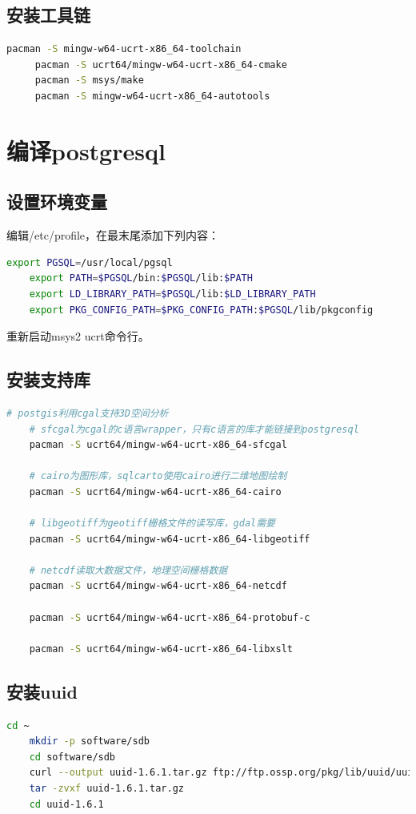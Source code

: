 \subsection{安装工具链}

\begin{lstlisting}[language=bash]
	 pacman -S mingw-w64-ucrt-x86_64-toolchain
	 pacman -S ucrt64/mingw-w64-ucrt-x86_64-cmake 
	 pacman -S msys/make
	 pacman -S mingw-w64-ucrt-x86_64-autotools
\end{lstlisting}

\section{编译postgresql}
\subsection{设置环境变量}
编辑/etc/profile，在最末尾添加下列内容：
\begin{lstlisting}[backgroundcolor = \color{codebackground}, language=bash]
	export PGSQL=/usr/local/pgsql
	export PATH=$PGSQL/bin:$PGSQL/lib:$PATH
	export LD_LIBRARY_PATH=$PGSQL/lib:$LD_LIBRARY_PATH
	export PKG_CONFIG_PATH=$PKG_CONFIG_PATH:$PGSQL/lib/pkgconfig
\end{lstlisting}
重新启动msys2 ucrt命令行。

\subsection{安装支持库}

\begin{lstlisting}[backgroundcolor = \color{codebackground}, language=bash]
	# postgis利用cgal支持3D空间分析
	# sfcgal为cgal的c语言wrapper，只有c语言的库才能链接到postgresql
	pacman -S ucrt64/mingw-w64-ucrt-x86_64-sfcgal 
	
	# cairo为图形库，sqlcarto使用cairo进行二维地图绘制
	pacman -S ucrt64/mingw-w64-ucrt-x86_64-cairo 
	
	# libgeotiff为geotiff栅格文件的读写库，gdal需要
	pacman -S ucrt64/mingw-w64-ucrt-x86_64-libgeotiff 
	
	# netcdf读取大数据文件，地理空间栅格数据
	pacman -S ucrt64/mingw-w64-ucrt-x86_64-netcdf
	
	pacman -S ucrt64/mingw-w64-ucrt-x86_64-protobuf-c
	
	pacman -S ucrt64/mingw-w64-ucrt-x86_64-libxslt
\end{lstlisting}


\subsection{安装uuid}
\begin{lstlisting}[backgroundcolor = \color{codebackground}, language=bash]
	cd ~
	mkdir -p software/sdb
	cd software/sdb
	curl --output uuid-1.6.1.tar.gz ftp://ftp.ossp.org/pkg/lib/uuid/uuid-1.6.1.tar.gz
	tar -zvxf uuid-1.6.1.tar.gz
	cd uuid-1.6.1
\end{lstlisting}


